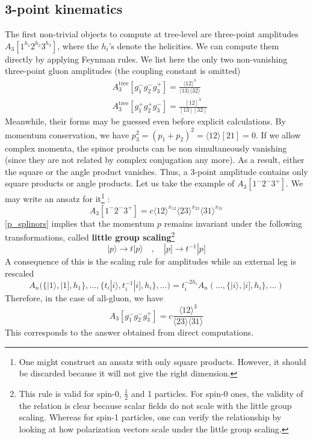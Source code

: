 \subsection*{3-point kinematics}
The first non-trivial objects to compute at tree-level are three-point amplitudes $A_3[1^{h_1}2^{h_2}3^{h_3}]$, where the $h_i$'s denote the helicities.
We can compute them directly by applying Feynman rules. 
We list here the only two non-vanishing three-point gluon amplitudes (the coupling constant is omitted)
\begin{equation*}
\begin{split}
& A^{\mathrm{tree}}_3[g_1^- g_2^- g_3^+] = \frac{\langle 12 \rangle^3}{\langle 13 \rangle \langle 32 \rangle}
\\
& A^{\mathrm{tree}}_3[g_1^+ g_2^+ g_3^-] = \frac{ [12]^3}{[13 ][ 32 ]}
\end{split}
\end{equation*}
Meanwhile, their forms may be guessed even before explicit calculations.  
By momentum conservation, we have $p_3^2 = (p_1 + p_2)^2 = \langle 12\rangle[21] = 0$. 
If we allow complex momenta, the spinor products can be non simultaneously vanishing (since they are not related by complex conjugation any more). 
As a result, either the square or the angle product vanishes.
Thus, a 3-point amplitude contains only square products or angle products. 
Let us take the example of $A_3[1^{-}2^{-}3^{+}]$.
We may write an ansatz for it\footnote{One might construct an ansatz with only square products. However, it should be discarded because it will not give the right dimension.} :
\begin{equation*}
A_3[1^{-}2^{-}3^{+}] = c\langle 12 \rangle^{x_{12}}\langle 23 \rangle^{x_{23}}\langle 31 \rangle^{x_{31}}
\end{equation*}
\cref{p_splinors} implies that the momentum $p$ remains invariant under the following transformations, called \textbf{little group scaling}\footnote{This rule is valid for spin-0, $\frac{1}{2}$ and 1 particles. 
For spin-0 ones, the validity of the relation is clear because scalar fields do not scale with the little group scaling.
Whereas for spin-1 particles, one can verify the relationship by looking at how polarization vectors scale under the little group scaling.
}
\begin{equation*}
|p\rangle \rightarrow t| p\rangle \quad,\quad 
|p]\rightarrow t^{-1} |p]
\end{equation*} 
A consequence of this is the scaling rule for amplitudes while an external leg is rescaled
\begin{equation*}
A_n \big(\{ |1\rangle, |1], h_1\},\ldots,\{t_i|i\rangle, t_i^{-1}|i], h_i\},\ldots\big) = 
t_i^{-2h_i}A_n(\ldots, \{|i\rangle,|i], h_i\},\ldots)
\end{equation*}
Therefore, in the case of all-gluon, we have
\begin{equation*}
A_3[g_1^-g_2^-g_3^+] = c\frac{\langle 12\rangle^3}{\langle 23 \rangle\langle 31\rangle}
\end{equation*}
This corresponds to the answer obtained from direct computations.
%
%
